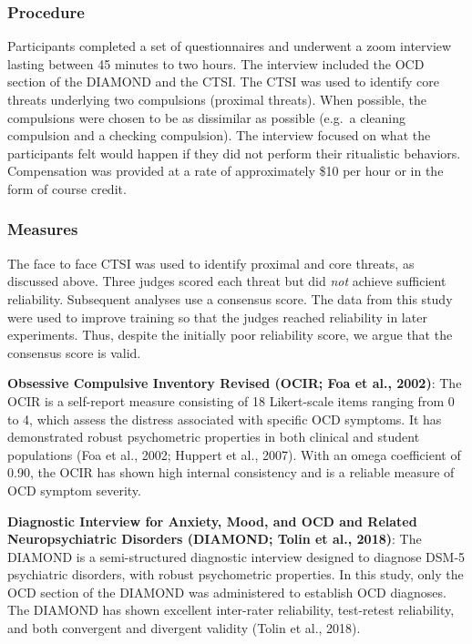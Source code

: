 \documentclass[
  man,floatsintext]{apa7}
\begin{document}
\subsubsection{Procedure}\label{procedure}

Participants completed a set of questionnaires and underwent a zoom interview lasting between 45 minutes to two hours.
The interview included the OCD section of the DIAMOND and the CTSI.
The CTSI was used to identify core threats underlying two compulsions (proximal threats).
When possible, the compulsions were chosen to be as dissimilar as possible (e.g.~a cleaning compulsion and a checking compulsion).
The interview focused on what the participants felt would happen if they did not perform their ritualistic behaviors.
Compensation was provided at a rate of approximately \$10 per hour or in the form of course credit.

\subsubsection{Measures}\label{measures-1}

The face to face CTSI was used to identify proximal and core threats, as discussed above.
Three judges scored each threat but did \emph{not} achieve sufficient reliability.
Subsequent analyses use a consensus score.
The data from this study were used to improve training so that the judges reached reliability in later experiments.
Thus, despite the initially poor reliability score, we argue that the consensus score is valid.

\textbf{Obsessive Compulsive Inventory Revised (OCIR; Foa et al., 2002)}: The OCIR is a self-report measure consisting of 18 Likert-scale items ranging from 0 to 4, which assess the distress associated with specific OCD symptoms.
It has demonstrated robust psychometric properties in both clinical and student populations (Foa et al., 2002; Huppert et al., 2007).
With an omega coefficient of 0.90, the OCIR has shown high internal consistency and is a reliable measure of OCD symptom severity.

\textbf{Diagnostic Interview for Anxiety, Mood, and OCD and Related Neuropsychiatric Disorders (DIAMOND; Tolin et al., 2018)}: The DIAMOND is a semi-structured diagnostic interview designed to diagnose DSM-5 psychiatric disorders, with robust psychometric properties.
In this study, only the OCD section of the DIAMOND was administered to establish OCD diagnoses.
The DIAMOND has shown excellent inter-rater reliability, test-retest reliability, and both convergent and divergent validity (Tolin et al., 2018).
\end{document}
